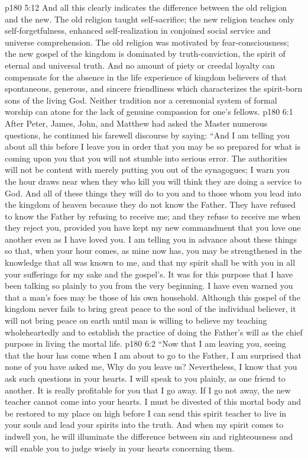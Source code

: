 \vs p180 5:12 And all this clearly indicates the difference between the old religion and the new. The old religion taught self\hyp{}sacrifice; the new religion teaches only self\hyp{}forgetfulness, enhanced self\hyp{}realization in conjoined social service and universe comprehension. The old religion was motivated by fear\hyp{}consciousness; the new gospel of the kingdom is dominated by truth\hyp{}conviction, the spirit of eternal and universal truth. And no amount of piety or creedal loyalty can compensate for the absence in the life experience of kingdom believers of that spontaneous, generous, and sincere friendliness which characterizes the spirit\hyp{}born sons of the living God. Neither tradition nor a ceremonial system of formal worship can atone for the lack of genuine compassion for one’s fellows.
\vs p180 6:1 After Peter, James, John, and Matthew had asked the Master numerous questions, he continued his farewell discourse by saying: \textcolor{ubdarkred}{“And I am telling you about all this before I leave you in order that you may be so prepared for what is coming upon you that you will not stumble into serious error. The authorities will not be content with merely putting you out of the synagogues; I warn you the hour draws near when they who kill you will think they are doing a service to God. And all of these things they will do to you and to those whom you lead into the kingdom of heaven because they do not know the Father. They have refused to know the Father by refusing to receive me; and they refuse to receive me when they reject you, provided you have kept my new commandment that you love one another even as I have loved you. I am telling you in advance about these things so that, when your hour comes, as mine now has, you may be strengthened in the knowledge that all was known to me, and that my spirit shall be with you in all your sufferings for my sake and the gospel’s. It was for this purpose that I have been talking so plainly to you from the very beginning. I have even warned you that a man’s foes may be those of his own household. Although this gospel of the kingdom never fails to bring great peace to the soul of the individual believer, it will not bring peace on earth until man is willing to believe my teaching wholeheartedly and to establish the practice of doing the Father’s will as the chief purpose in living the mortal life.}
\vs p180 6:2 \textcolor{ubdarkred}{“Now that I am leaving you, seeing that the hour has come when I am about to go to the Father, I am surprised that none of you have asked me, Why do you leave us? Nevertheless, I know that you ask such questions in your hearts. I will speak to you plainly, as one friend to another. It is really profitable for you that I go away. If I go not away, the new teacher cannot come into your hearts. I must be divested of this mortal body and be restored to my place on high before I can send this spirit teacher to live in your souls and lead your spirits into the truth. And when my spirit comes to indwell you, he will illuminate the difference between sin and righteousness and will enable you to judge wisely in your hearts concerning them.}
